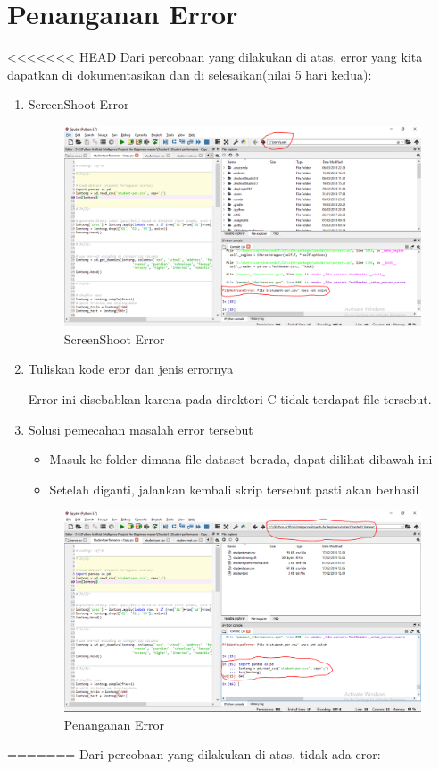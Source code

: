 \section{Penanganan Error}
<<<<<<< HEAD
Dari percobaan yang dilakukan di atas, error yang kita dapatkan di dokumentasikan dan di selesaikan(nilai 5 hari kedua):

\begin{enumerate}
	\item
ScreenShoot Error
\begin{figure}[ht]
\centering
\includegraphics[scale=0.3]{figures/lontong/13.png}
\caption{ScreenShoot Error}
\end{figure}
	\item
Tuliskan kode eror dan jenis errornya
\par
Error ini disebabkan karena pada direktori C tidak terdapat file tersebut. 
	\item
Solusi pemecahan masalah error tersebut
\begin{itemize}
\item 	Masuk ke folder dimana file dataset berada, dapat dilihat dibawah ini
\item 	Setelah diganti, jalankan kembali skrip tersebut pasti akan berhasil
\end{itemize}
\begin{figure}[ht]
\centering
\includegraphics[scale=0.3]{figures/lontong/14.png}
\caption{Penanganan Error}
\end{figure}

\end{enumerate}
=======
Dari percobaan yang dilakukan di atas, tidak ada eror:

